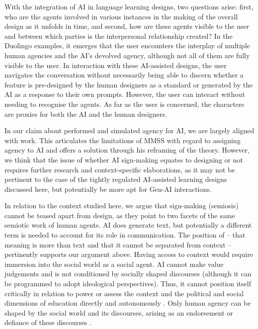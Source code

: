 \documentclass[english]{textolivre}
\begin{document}
With the integration of AI in language learning designs, two questions arise: first, who are the agents involved in various instances in the making of the overall design as it unfolds in time, and second, how are these agents visible to the user and between which parties is the interpersonal relationship created? In the Duolingo examples, it emerges that the user encounters the interplay of multiple human agencies and the AI’s devolved agency, although not all of them are fully visible to the user. In interaction with these AI-assisted designs, the user navigates the conversation without necessarily being able to discern whether a feature is pre-designed by the human designers as a standard or generated by the AI as a response to their own prompts. However, the user can interact without needing to recognise the agents. As far as the user is concerned, the characters are proxies for both the AI and the human designers.

In our claim about performed and simulated agency for AI, we are largely aligned with  work. This articulates the limitations of MMSS with regard to assigning agency to AI and offers a solution through his reframing of the theory. However, we think that the issue of whether AI sign-making equates to designing or not requires further research and context-specific elaborations, as it may not be pertinent to the case of the tightly regulated AI-assisted learning designs discussed here, but potentially be more apt for Gen-AI interactions.

In relation to the context studied here, we argue that sign-making (semiosis) cannot be teased apart from design, as they point to two facets of the same semiotic work of human agents. AI does generate text, but potentially a different term is needed to account for its role in communication. The position of \textcite{cope2024a_multimodal} – that meaning is more than text and that it cannot be separated from context – pertinently supports our argument above. Having access to context would require immersion into the social world as a social agent. AI cannot make value judgements and is not conditioned by socially shaped discourses (although it can be programmed to adopt ideological perspectives). Thus, it cannot position itself critically in relation to power or assess the context and the political and social dimensions of education directly and autonomously \cite{cope2024b_cybersocial}. Only human agency can be shaped by the social world and its discourses, arising as an endorsement or defiance of these discourses \cite{diamantopoulou2024agency}.
\end{document}
